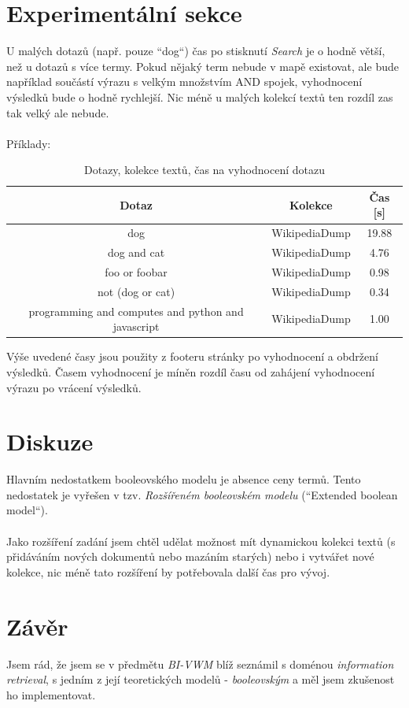 \documentclass[a4paper,titlepage]{article}
\begin{document}
\section*{Experimentální sekce}

U malých dotazů (např. pouze ``dog``) čas po stisknutí \emph{Search} je o hodně větší,
než u dotazů s více termy. Pokud nějaký term nebude v mapě existovat,
ale bude například součástí výrazu s velkým množstvím AND spojek, vyhodnocení
výsledků bude o hodně rychlejší. Nic méně u malých kolekcí textů ten rozdíl zas tak velký ale nebude.
\\~\\
Příklady:

\begin{table}[h!]
\centering
\begin{tabular}{||c c c||} 
 \hline
 Dotaz & Kolekce & Čas [s]\\ [0.5ex] 
 \hline\hline
 dog & WikipediaDump & 19.88 \\ 
 dog and cat & WikipediaDump & 4.76 \\
 foo or foobar & WikipediaDump & 0.98 \\
 not (dog or cat) & WikipediaDump & 0.34 \\
 programming and computes and python and javascript & WikipediaDump & 1.00 \\
 \hline
\end{tabular}
\caption{Dotazy, kolekce textů, čas na vyhodnocení dotazu}
\end{table}

Výše uvedené časy jsou použity z footeru stránky po vyhodnocení a obdržení výsledků.
Časem vyhodnocení je míněn rozdíl času od zahájení vyhodnocení výrazu po vrácení výsledků.

\section*{Diskuze}

Hlavním nedostatkem booleovského modelu je absence ceny termů. Tento nedostatek je vyřešen
v tzv. \emph{Rozšířeném booleovském modelu} (``Extended boolean model``).
\\~\\
Jako rozšíření zadání jsem chtěl udělat možnost mít dynamickou kolekci textů (s přidáváním nových
dokumentů nebo mazáním starých) nebo i vytvářet nové kolekce, nic méně tato rozšíření by potřebovala
další čas pro vývoj.

\section*{Závěr}
Jsem rád, že jsem se v předmětu \emph{BI-VWM} blíž seznámil s doménou \emph{information retrieval},
s jedním z její teoretických modelů - \emph{booleovským} a měl jsem zkušenost ho implementovat.
\end{document}
